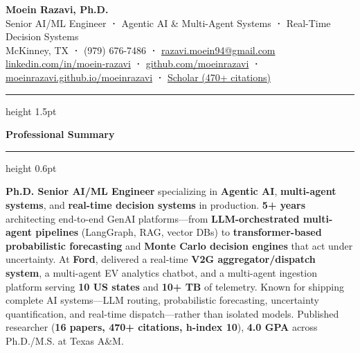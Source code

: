 \documentclass[10.5pt,letterpaper]{article}
\newcommand{\cvsection}[1]{%
  \vspace{0.18em}%
  {\color{headerblue}\large\bfseries #1}%
  \vspace{0.06em}%
  {\color{goldaccent}\hrule height 0.6pt}%
  \vspace{0.18em}%
}
\begin{document}
\begin{center}
  {\fontsize{20}{24}\selectfont\bfseries\color{headerblue}Moein Razavi, Ph.D.}\\[0.2em]
  {\large\color{darktext}
    Senior AI/ML Engineer\enspace
    {\color{goldaccent}\textbf{·}}\enspace
    Agentic AI \& Multi-Agent Systems\enspace
    {\color{goldaccent}\textbf{·}}\enspace
    Real-Time Decision Systems
  }\\[0.3em]
  {\color{graytext}
    McKinney, TX\enspace
    {\color{goldaccent}\textbf{·}}\enspace
    (979) 676-7486\enspace
    {\color{goldaccent}\textbf{·}}\enspace
    \href{mailto:razavi.moein94@gmail.com}{razavi.moein94@gmail.com}
  }\\[0.15em]
  {\color{graytext}
    \href{https://linkedin.com/in/moein-razavi}{linkedin.com/in/moein-razavi}\enspace
    {\color{goldaccent}\textbf{·}}\enspace
    \href{https://github.com/moeinrazavi}{github.com/moeinrazavi}\enspace
    {\color{goldaccent}\textbf{·}}\enspace
    \href{https://moeinrazavi.github.io/moeinrazavi/}{moeinrazavi.github.io/moeinrazavi}\enspace
    {\color{goldaccent}\textbf{·}}\enspace
    {\color{accentcolor}\href{https://scholar.google.com/citations?user=wj_qWaQAAAAJ}{Scholar (470+ citations)}}
  }
\end{center}

\vspace{0.12em}
{\color{goldaccent}\hrule height 1.5pt}
\vspace{0.22em}

\cvsection{Professional Summary}

{\color{darktext}
\textbf{Ph.D. Senior AI/ML Engineer} specializing in \textbf{Agentic AI}, \textbf{multi-agent systems}, and \textbf{real-time decision systems} in production. \textbf{5+ years} architecting end-to-end GenAI platforms---from \textbf{LLM-orchestrated multi-agent pipelines} (LangGraph, RAG, vector DBs) to \textbf{transformer-based probabilistic forecasting} and \textbf{Monte Carlo decision engines} that act under uncertainty. At \textbf{Ford}, delivered a real-time \textbf{V2G aggregator/dispatch system}, a multi-agent EV analytics chatbot, and a multi-agent ingestion platform serving \textbf{10 US states} and \textbf{10+ TB} of telemetry. Known for shipping complete AI systems---LLM routing, probabilistic forecasting, uncertainty quantification, and real-time dispatch---rather than isolated models. Published researcher (\textbf{16 papers, 470+ citations, h-index 10}), \textbf{4.0 GPA} across Ph.D./M.S. at Texas A\&M.
}
\end{document}
